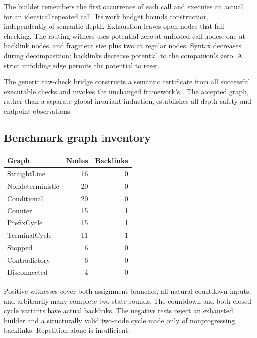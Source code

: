 The builder remembers the first occurrence of each call and executes an
actual  for an identical repeated call. Its work budget
bounds construction, independently of semantic depth. Exhaustion leaves
open nodes that fail checking.
The routing witness uses potential zero at unfolded call nodes, one at
backlink nodes, and fragment size plus two at regular nodes. Syntax
decreases during decomposition; backlinks decrease potential to the
companion's zero. A strict unfolding edge permits the potential to reset.

The generic raw-check bridge constructs a semantic certificate from all
successful executable checks and invokes the unchanged framework's
. The accepted graph, rather than a separate
global invariant induction, establishes all-depth safety and endpoint
observations.

\subsection{Benchmark graph inventory}
\begin{center}
\begin{tabular}{@{}lrr@{}}
\toprule
Graph & Nodes & Backlinks\\
\midrule
StraightLine & 16 & 0\\
Nondeterministic & 20 & 0\\
Conditional & 20 & 0\\
Counter & 15 & 1\\
PrefixCycle & 15 & 1\\
TerminalCycle & 11 & 1\\
Stopped & 6 & 0\\
Contradictory & 6 & 0\\
Disconnected & 4 & 0\\
\bottomrule
\end{tabular}
\end{center}
Positive witnesses cover both assignment branches, all natural countdown
inputs, and arbitrarily many complete two-state rounds. The countdown and
both closed-cycle variants have actual backlinks. The negative tests
reject an exhausted builder and a structurally valid two-node cycle made
only of nonprogressing backlinks. Repetition alone is insufficient.

